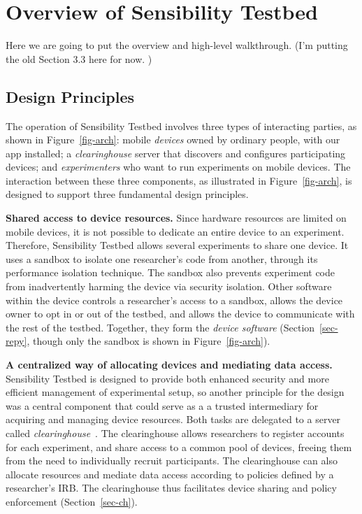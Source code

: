 \section{Overview of Sensibility Testbed}\label{sec-overview}
Here we are going to put the overview and high-level walkthrough. (I'm putting the old Section 3.3 here for now. )

\subsection{Design Principles}\label{sec-overview}

The operation of Sensibility Testbed  involves three types of interacting
parties, as shown in Figure~\ref{fig-arch}: mobile \textit{devices} 
owned by ordinary people, with our app installed; a 
\textit{clearinghouse} server that discovers and configures
participating devices; and \textit{experimenters} who want to run
experiments on mobile devices. The interaction between these three 
components, as illustrated in Figure~\ref{fig-arch}, is designed to 
support three fundamental design principles.

\textbf{Shared access to device resources.} 
Since hardware resources are limited on mobile devices, it is 
not possible to dedicate an entire device to an experiment. Therefore, 
Sensibility Testbed allows several experiments to share one device. It 
uses a sandbox to isolate one researcher's code from 
 another, through its performance isolation technique. The sandbox 
also prevents experiment code from inadvertently harming the device
via security isolation. Other software within the device controls a
researcher's access to a sandbox, allows the device 
owner to opt in or out of the testbed, and allows the device
to communicate with the rest of the testbed. Together, they form the
\textit{device software} (Section~\ref{sec-repy}, though only the 
sandbox is shown in Figure~\ref{fig-arch}).

\textbf{A centralized way of allocating devices and mediating data access.}
Sensibility Testbed is designed to provide both enhanced security and 
more efficient management of experimental setup, so another principle 
for the design was a central component that could serve as a a trusted 
intermediary for acquiring and managing device resources. Both tasks 
are delegated to  a server called \textit{clearinghouse}~\cite{ch}. The 
clearinghouse allows researchers to 
register accounts for each experiment, and share access to a common 
pool of devices, freeing them from the need to individually recruit participants. 
The clearinghouse can also allocate resources and mediate 
data access according to policies defined by a researcher's IRB. The 
clearinghouse thus facilitates device sharing and policy enforcement 
(Section~\ref{sec-ch}).

